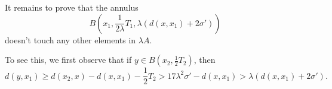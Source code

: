 It remains to prove that the annulus 
\[
B(x_1,\frac{1}{2\lambda}T_1, \lambda(d(x,x_1)+2\sigma'))
\]
doesn't touch any other
elements in $\mathfrak \lambda A$.

To see this, we first observe that if $y\in B(x_2, \frac 12T_2)$, then 
\[
d(y, x_1)\geq d(x_2, x)-d(x, x_1)-\frac 12 T_2>17\lambda^2\sigma'-d(x,x_1)>\lambda(d(x,x_1)+2\sigma').
\]

